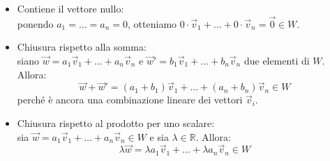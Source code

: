 \documentclass[10pt]{extarticle}
\begin{document}
\begin{itemize}
    \item Contiene il vettore nullo: \\
    ponendo $a_1 = \dots = a_n = 0$, otteniamo $0 \cdot \vec{v}_1 + \dots + 0 \cdot \vec{v}_n = \vec{0} \in W$.

    \item Chiusura rispetto alla somma: \\
    siano $\vec{w} = a_1\vec{v}_1 + \dots + a_n\vec{v}_n$ e $\vec{w}' = b_1\vec{v}_1 + \dots + b_n\vec{v}_n$ due elementi di $W$. Allora:
    \[
    \vec{w} + \vec{w}' = (a_1 + b_1)\vec{v}_1 + \dots + (a_n + b_n)\vec{v}_n \in W
    \]
    perché è ancora una combinazione lineare dei vettori $\vec{v}_i$.

    \item Chiusura rispetto al prodotto per uno scalare: \\
    sia $\vec{w} = a_1\vec{v}_1 + \dots + a_n\vec{v}_n \in W$ e sia $\lambda \in \mathbb{R}$. Allora:
    \[
    \lambda \vec{w} = \lambda a_1 \vec{v}_1 + \dots + \lambda a_n \vec{v}_n \in W
    \]
\end{itemize}
\end{document}
